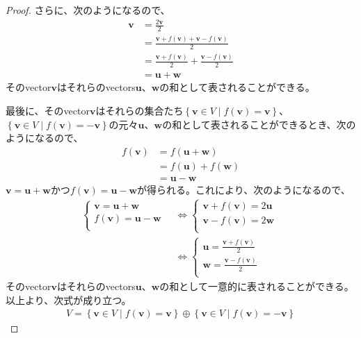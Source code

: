 \documentclass[dvipdfmx]{jsarticle}
\begin{document}
\begin{proof}
さらに、次のようになるので、
\begin{align*}
\mathbf{v} &= \frac{2\mathbf{v}}{2}\\
&= \frac{\mathbf{v} + f\left( \mathbf{v} \right) + \mathbf{v} - f\left( \mathbf{v} \right)}{2}\\
&= \frac{\mathbf{v} + f\left( \mathbf{v} \right)}{2} + \frac{\mathbf{v} - f\left( \mathbf{v} \right)}{2}\\
&= \mathbf{u} + \mathbf{w}
\end{align*}
そのvector$\mathbf{v}$はそれらのvectors$\mathbf{u}$、$\mathbf{w}$の和として表されることができる。\par
最後に、そのvector$\mathbf{v}$はそれらの集合たち$\left\{ \mathbf{v} \in V \middle| f\left( \mathbf{v} \right) = \mathbf{v} \right\}$、$\left\{ \mathbf{v} \in V \middle| f\left( \mathbf{v} \right) = - \mathbf{v} \right\}$の元々$\mathbf{u}$、$\mathbf{w}$の和として表されることができるとき、次のようになるので、
\begin{align*}
f\left( \mathbf{v} \right) &= f\left( \mathbf{u} + \mathbf{w} \right)\\
&= f\left( \mathbf{u} \right) + f\left( \mathbf{w} \right)\\
&= \mathbf{u} - \mathbf{w}
\end{align*}
$\mathbf{v} = \mathbf{u} + \mathbf{w}$かつ$f\left( \mathbf{v} \right) = \mathbf{u} - \mathbf{w}$が得られる。これにより、次のようになるので、
\begin{align*}
\left\{ \begin{matrix}
\mathbf{v} = \mathbf{u} + \mathbf{w} \\
f\left( \mathbf{v} \right) = \mathbf{u} - \mathbf{w} \\
\end{matrix} \right.\  &\Leftrightarrow \left\{ \begin{matrix}
\mathbf{v} + f\left( \mathbf{v} \right) = 2\mathbf{u} \\
\mathbf{v} - f\left( \mathbf{v} \right) = 2\mathbf{w} \\
\end{matrix} \right.\ \\
&\Leftrightarrow \left\{ \begin{matrix}
\mathbf{u} = \frac{\mathbf{v} + f\left( \mathbf{v} \right)}{2} \\
\mathbf{w} = \frac{\mathbf{v} - f\left( \mathbf{v} \right)}{2} \\
\end{matrix} \right.
\end{align*}
そのvector$\mathbf{v}$はそれらのvectors$\mathbf{u}$、$\mathbf{w}$の和として一意的に表されることができる。以上より、次式が成り立つ。
\begin{align*}
V = \left\{ \mathbf{v} \in V \middle| f\left( \mathbf{v} \right) = \mathbf{v} \right\} \oplus \left\{ \mathbf{v} \in V \middle| f\left( \mathbf{v} \right) = - \mathbf{v} \right\}
\end{align*}
\end{proof}
\end{document}
